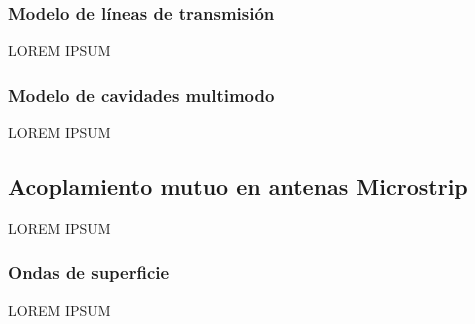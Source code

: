 \subsubsection{Modelo de líneas de transmisión}
\label{subsubsec_microstrip_modeloLineas}
LOREM IPSUM
\subsubsection{Modelo de cavidades multimodo}
\label{subsubsec_microstrip_modeloCavidades}
LOREM IPSUM

\subsection{Acoplamiento mutuo en antenas Microstrip}
\label{subsec_acoplamiento_microstrip}
LOREM IPSUM
\subsubsection{Ondas de superficie}
\label{subsubsec_microstrip_ondas_superficie}
LOREM IPSUM

